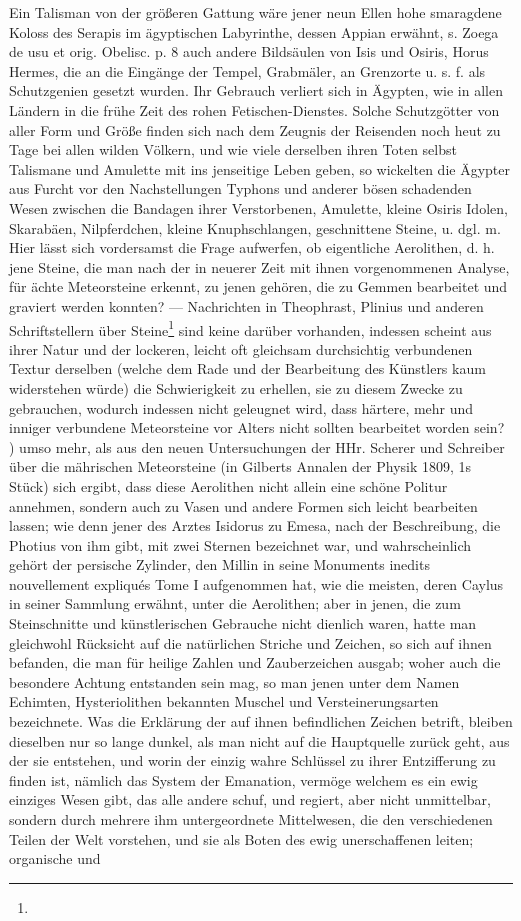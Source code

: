 \documentclass[a4paper, 11pt, oneside, polutonikogreek, german]{article}
\begin{document}
Ein Talisman von der größeren Gattung wäre jener neun Ellen hohe smaragdene Koloss des Serapis im ägyptischen Labyrinthe, dessen Appian erwähnt, s. Zoega de usu et orig. Obelisc. p. 8 auch andere Bildsäulen von Isis und Osiris, Horus Hermes, die an die Eingänge der Tempel, Grabmäler, an Grenzorte u. s. f. als Schutzgenien gesetzt wurden. Ihr Gebrauch verliert sich in Ägypten, wie in allen Ländern in die frühe Zeit des rohen Fetischen-Dienstes. Solche Schutzgötter von aller Form und Größe finden sich nach dem Zeugnis der Reisenden noch heut zu Tage bei allen wilden Völkern, und wie viele derselben ihren Toten selbst Talismane und Amulette mit ins jenseitige Leben geben, so wickelten die Ägypter aus Furcht vor den Nachstellungen Typhons und anderer bösen schadenden Wesen zwischen die Bandagen ihrer Verstorbenen, Amulette, kleine Osiris Idolen, Skarabäen, Nilpferdchen, kleine Knuphschlangen, geschnittene Steine, u. dgl. m. Hier lässt sich vordersamst die Frage aufwerfen, ob eigentliche Aerolithen, d. h. jene Steine, die man nach der in neuerer Zeit mit ihnen vorgenommenen Analyse, für ächte Meteorsteine erkennt, zu jenen gehören, die zu Gemmen bearbeitet und graviert werden konnten? --- Nachrichten in Theophrast, Plinius und anderen Schriftstellern über Steine\footnote{} sind keine darüber vorhanden, indessen scheint aus ihrer Natur und der lockeren, leicht oft gleichsam durchsichtig verbundenen Textur derselben (welche dem Rade und der Bearbeitung des Künstlers kaum widerstehen würde) die Schwierigkeit zu erhellen, sie zu diesem Zwecke zu gebrauchen, wodurch indessen nicht geleugnet wird, dass härtere, mehr und inniger verbundene Meteorsteine vor Alters nicht sollten bearbeitet worden sein? ) umso mehr, als aus den neuen Untersuchungen der HHr. Scherer und Schreiber über die mährischen Meteorsteine (in Gilberts Annalen der Physik 1809, 1s Stück) sich ergibt, dass diese Aerolithen nicht allein eine schöne Politur annehmen, sondern auch zu Vasen und andere Formen sich leicht bearbeiten lassen; wie denn jener des Arztes Isidorus zu Emesa, nach der Beschreibung, die Photius von ihm gibt, mit zwei Sternen bezeichnet war, und wahrscheinlich gehört der persische Zylinder, den Millin in seine Monuments inedits nouvellement expliqués Tome I aufgenommen hat, wie die meisten, deren Caylus in seiner Sammlung erwähnt, unter die Aerolithen; aber in jenen, die zum Steinschnitte und künstlerischen Gebrauche nicht dienlich waren, hatte man gleichwohl Rücksicht auf die natürlichen Striche und Zeichen, so sich auf ihnen befanden, die man für heilige Zahlen und Zauberzeichen ausgab; woher auch die besondere Achtung entstanden sein mag, so man jenen unter dem Namen Echimten, Hysteriolithen bekannten Muschel und Versteinerungsarten bezeichnete. Was die Erklärung der auf ihnen befindlichen Zeichen betrift, bleiben dieselben nur so lange dunkel, als man nicht auf die Hauptquelle zurück geht, aus der sie entstehen, und worin der einzig wahre Schlüssel zu ihrer Entzifferung zu finden ist, nämlich das System der Emanation, vermöge welchem es ein ewig einziges Wesen gibt, das alle andere schuf, und regiert, aber nicht unmittelbar, sondern durch mehrere ihm untergeordnete Mittelwesen, die den verschiedenen Teilen der Welt vorstehen, und sie als Boten des ewig unerschaffenen leiten; organische und 
\end{document}
